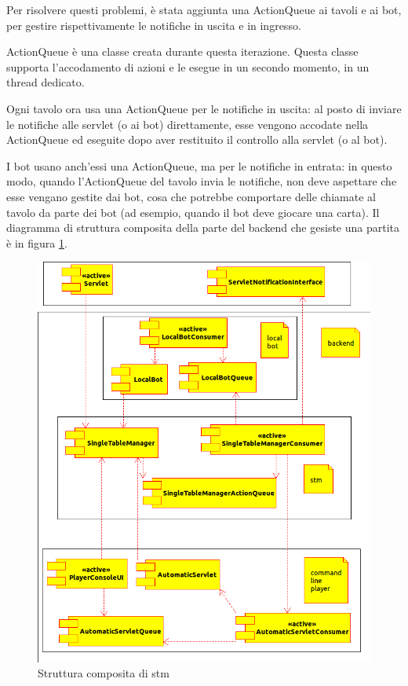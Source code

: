   Per risolvere questi problemi, \`e stata aggiunta una ActionQueue ai tavoli
  e ai bot, per gestire rispettivamente le notifiche in uscita e in ingresso.

  ActionQueue \`e una classe creata durante questa iterazione. Questa classe
  supporta l'accodamento di azioni e le esegue in un secondo momento, in un
  thread dedicato.

  Ogni tavolo ora usa una ActionQueue per le notifiche in uscita:
  al posto di inviare le notifiche alle servlet (o ai bot) direttamente, esse
  vengono accodate nella ActionQueue ed eseguite dopo aver restituito il
  controllo alla servlet (o al bot).

  I bot usano anch'essi una ActionQueue, ma per le notifiche in entrata:
  in questo modo, quando l'ActionQueue del tavolo invia le notifiche, non
  deve aspettare che esse vengano gestite dai bot, cosa che potrebbe
  comportare delle chiamate al tavolo da parte dei bot (ad esempio, quando
  il bot deve giocare una carta).
  Il diagramma di struttura composita della parte del backend che gesiste una 
  partita \`e in figura \ref{fig:struttura composita di stm}.

\begin{figure}
  \begin{center}
    \includegraphics[scale=0.5]{backend_composit_structure.png}  
  \end{center}
  \caption{Struttura composita di stm}
  \label{fig:struttura composita di stm}
\end{figure}

